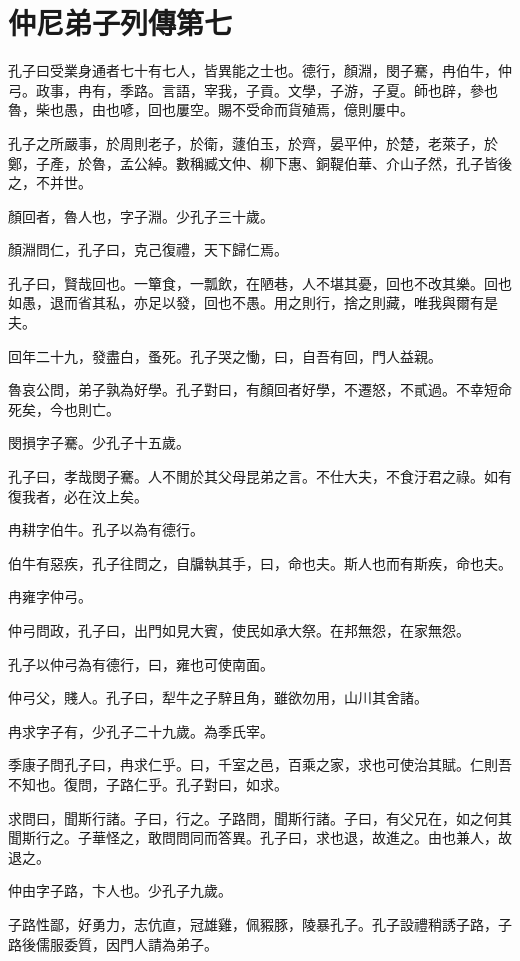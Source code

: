 \chapter{仲尼弟子列傳第七}

孔子曰受業身通者七十有七人，皆異能之士也。德行，顏淵，閔子騫，冉伯牛，仲弓。政事，冉有，季路。言語，宰我，子貢。文學，子游，子夏。師也辟，參也魯，柴也愚，由也喭，回也屢空。賜不受命而貨殖焉，億則屢中。

孔子之所嚴事，於周則老子，於衛，蘧伯玉，於齊，晏平仲，於楚，老萊子，於鄭，子產，於魯，孟公綽。數稱臧文仲、柳下惠、銅鞮伯華、介山子然，孔子皆後之，不并世。

顏回者，魯人也，字子淵。少孔子三十歲。

顏淵問仁，孔子曰，克己復禮，天下歸仁焉。

孔子曰，賢哉回也。一簞食，一瓢飲，在陋巷，人不堪其憂，回也不改其樂。回也如愚，退而省其私，亦足以發，回也不愚。用之則行，捨之則藏，唯我與爾有是夫。

回年二十九，發盡白，蚤死。孔子哭之慟，曰，自吾有回，門人益親。

魯哀公問，弟子孰為好學。孔子對曰，有顏回者好學，不遷怒，不貳過。不幸短命死矣，今也則亡。

閔損字子騫。少孔子十五歲。

孔子曰，孝哉閔子騫。人不閒於其父母昆弟之言。不仕大夫，不食汙君之祿。如有復我者，必在汶上矣。

冉耕字伯牛。孔子以為有德行。

伯牛有惡疾，孔子往問之，自牖執其手，曰，命也夫。斯人也而有斯疾，命也夫。

冉雍字仲弓。

仲弓問政，孔子曰，出門如見大賓，使民如承大祭。在邦無怨，在家無怨。

孔子以仲弓為有德行，曰，雍也可使南面。

仲弓父，賤人。孔子曰，犁牛之子騂且角，雖欲勿用，山川其舍諸。

冉求字子有，少孔子二十九歲。為季氏宰。

季康子問孔子曰，冉求仁乎。曰，千室之邑，百乘之家，求也可使治其賦。仁則吾不知也。復問，子路仁乎。孔子對曰，如求。

求問曰，聞斯行諸。子曰，行之。子路問，聞斯行諸。子曰，有父兄在，如之何其聞斯行之。子華怪之，敢問問同而答異。孔子曰，求也退，故進之。由也兼人，故退之。

仲由字子路，卞人也。少孔子九歲。

子路性鄙，好勇力，志伉直，冠雄雞，佩豭豚，陵暴孔子。孔子設禮稍誘子路，子路後儒服委質，因門人請為弟子。

